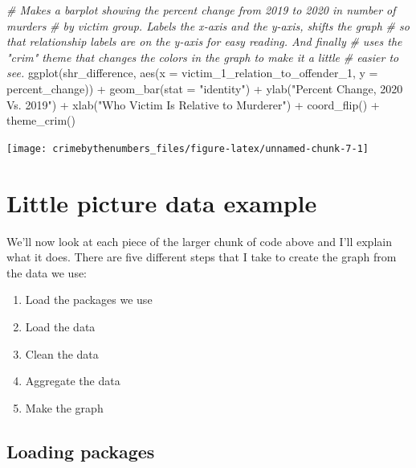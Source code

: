\documentclass[
]{krantz}
\makeatletter
\newenvironment{Shaded}{\begin{snugshade}}{\end{snugshade}}
\newcommand{\AttributeTok}[1]{\textcolor[rgb]{0.61,0.61,0.61}{#1}}
\newcommand{\CommentTok}[1]{\textcolor[rgb]{0.37,0.37,0.37}{\textit{#1}}}
\newcommand{\FunctionTok}[1]{\textcolor[rgb]{0,0,0}{#1}}
\newcommand{\NormalTok}[1]{#1}
\newcommand{\SpecialCharTok}[1]{\textcolor[rgb]{0,0,0}{#1}}
\newcommand{\StringTok}[1]{\textcolor[rgb]{0.5,0.5,0.5}{#1}}
\providecommand{\tightlist}{%
  \setlength{\itemsep}{0pt}\setlength{\parskip}{0pt}}
\newenvironment{kframe}{%
\medskip{}
\setlength{\fboxsep}{.8em}
 \def\at@end@of@kframe{}%
 \ifinner\ifhmode%
  \def\at@end@of@kframe{\end{minipage}}%
  \begin{minipage}{\columnwidth}%
 \fi\fi%
 \def\FrameCommand##1{\hskip\@totalleftmargin \hskip-\fboxsep
 \colorbox{shadecolor}{##1}\hskip-\fboxsep
     \hskip-\linewidth \hskip-\@totalleftmargin \hskip\columnwidth}%
 \MakeFramed {\advance\hsize-\width
   \@totalleftmargin\z@ \linewidth\hsize
   \@setminipage}}%
 {\par\unskip\endMakeFramed%
 \at@end@of@kframe}
\renewenvironment{Shaded}{\begin{kframe}}{\end{kframe}}
\makeatother
\begin{document}
\begin{Shaded}
\begin{Highlighting}[]
\CommentTok{\# Makes a barplot showing the percent change from 2019 to 2020 in number of murders}
\CommentTok{\# by victim group. Labels the x{-}axis and the y{-}axis, shifts the graph}
\CommentTok{\# so that relationship labels are on the y{-}axis for easy reading. And finally}
\CommentTok{\# uses the "crim" theme that changes the colors in the graph to make it a little}
\CommentTok{\# easier to see.}
\FunctionTok{ggplot}\NormalTok{(shr\_difference, }\FunctionTok{aes}\NormalTok{(}\AttributeTok{x =}\NormalTok{ victim\_1\_relation\_to\_offender\_1, }
                                        \AttributeTok{y =}\NormalTok{ percent\_change)) }\SpecialCharTok{+}
  \FunctionTok{geom\_bar}\NormalTok{(}\AttributeTok{stat =} \StringTok{"identity"}\NormalTok{) }\SpecialCharTok{+}
  \FunctionTok{ylab}\NormalTok{(}\StringTok{"Percent Change, 2020 Vs. 2019"}\NormalTok{) }\SpecialCharTok{+}
  \FunctionTok{xlab}\NormalTok{(}\StringTok{"Who Victim Is Relative to Murderer"}\NormalTok{) }\SpecialCharTok{+} 
  \FunctionTok{coord\_flip}\NormalTok{() }\SpecialCharTok{+}
  \FunctionTok{theme\_crim}\NormalTok{() }
\end{Highlighting}
\end{Shaded}

\begin{center}\texttt{[image: crimebythenumbers\_files/figure-latex/unnamed-chunk-7-1]} \end{center}

\hypertarget{little-picture-data-example}{%
\section{Little picture data example}\label{little-picture-data-example}}

We'll now look at each piece of the larger chunk of code above and I'll explain what it does. There are five different steps that I take to create the graph from the data we use:

\begin{enumerate}
\def\labelenumi{\arabic{enumi}.}
\tightlist
\item
  Load the packages we use
\item
  Load the data
\item
  Clean the data
\item
  Aggregate the data
\item
  Make the graph
\end{enumerate}

\hypertarget{loading-packages}{%
\subsection{Loading packages}\label{loading-packages}}
\end{document}
